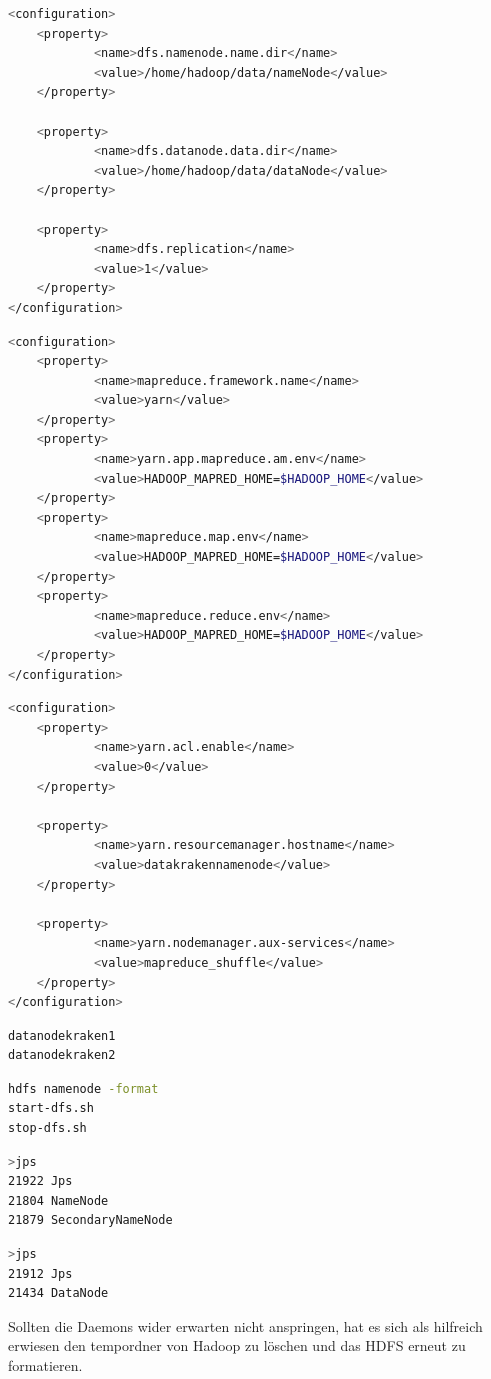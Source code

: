 \documentclass[12pt,twoside,a4paper,parskip]{scrbook}
\begin{document}
\begin{lstlisting}[caption=hadoop/etc/hadoop/hdfs-site.xml,label=hdfssitexml,language=bash]
<configuration>
    <property>
            <name>dfs.namenode.name.dir</name>
            <value>/home/hadoop/data/nameNode</value>
    </property>

    <property>
            <name>dfs.datanode.data.dir</name>
            <value>/home/hadoop/data/dataNode</value>
    </property>

    <property>
            <name>dfs.replication</name>
            <value>1</value>
    </property>
</configuration>
\end{lstlisting}\begin{lstlisting}[caption=/hadoop/etc/hadoop/mapred-site.xml,label=mapredsitexml,language=bash]
<configuration>
    <property>
            <name>mapreduce.framework.name</name>
            <value>yarn</value>
    </property>
    <property>
            <name>yarn.app.mapreduce.am.env</name>
            <value>HADOOP_MAPRED_HOME=$HADOOP_HOME</value>
    </property>
    <property>
            <name>mapreduce.map.env</name>
            <value>HADOOP_MAPRED_HOME=$HADOOP_HOME</value>
    </property>
    <property>
            <name>mapreduce.reduce.env</name>
            <value>HADOOP_MAPRED_HOME=$HADOOP_HOME</value>
    </property>
</configuration>
\end{lstlisting}
\begin{lstlisting}[caption=/hadoop/etc/hadoop/yarn-site.xml,label=yarnsitexml,language=bash]
<configuration>
    <property>
            <name>yarn.acl.enable</name>
            <value>0</value>
    </property>

    <property>
            <name>yarn.resourcemanager.hostname</name>
            <value>datakrakennamenode</value>
    </property>

    <property>
            <name>yarn.nodemanager.aux-services</name>
            <value>mapreduce_shuffle</value>
    </property>
</configuration>

\end{lstlisting}
\begin{lstlisting}[caption=/hadoop/etc/hadoop/workers,label=workers,language=bash]
datanodekraken1
datanodekraken2
\end{lstlisting}
\begin{lstlisting}[caption=Formatieren des HDFS und Start/Stop,label=start,language=bash]
hdfs namenode -format
start-dfs.sh
stop-dfs.sh
\end{lstlisting}
\begin{lstlisting}[caption=Check ob daemon auf datakrakennamenode läuft,label=jpsnamenode,language=bash] %hier noch orginal von cmd einfügen
>jps
21922 Jps
21804 NameNode
21879 SecondaryNameNode
\end{lstlisting}
\begin{lstlisting}[caption=Check ob daemon auf den workern läuft,label=jpsworker,language=bash]
>jps
21912 Jps
21434 DataNode
\end{lstlisting}
Sollten die Daemons wider erwarten nicht anspringen, hat es sich als hilfreich erwiesen den tempordner von Hadoop zu löschen und das HDFS erneut zu formatieren.
\end{document}
